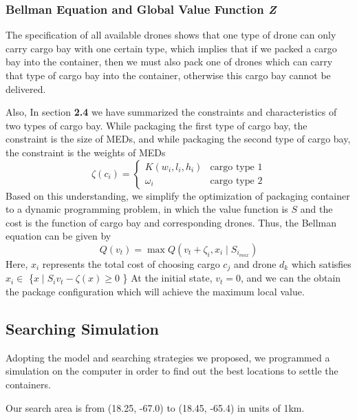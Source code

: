 \documentclass[12pt]{article}
\begin{document}
			\subsubsection{Bellman Equation and Global Value Function \textit{Z}}
			The specification of all available drones shows that one type of drone can only carry cargo bay with one certain type, which implies that if we packed a cargo bay into the container, then we must also pack one of drones which can carry that type of cargo bay into the container, otherwise this cargo bay cannot be delivered.\par 
			Also, In section \textbf{2.4} we have summarized the constraints and characteristics of two types of cargo bay. While packaging the first type of cargo bay, the constraint is the size of MEDs, and while packaging the second type of cargo bay, the constraint is the weights of MEDs
			\begin{equation}
				\zeta(c_i) = 
				\begin{cases}
				K(w_i, l_i, h_i) &\mbox{cargo type 1} \\
				\omega_i &\mbox{cargo type 2}
				\end{cases}
			\end{equation}
			Based on this understanding, we simplify the optimization of packaging container to a dynamic programming problem, in which the value function is $S$ and the cost is the function of cargo bay and corresponding drones. Thus, the Bellman equation can be given by 
			\begin{equation}
			Q(v_t) = \max Q(v_t+\zeta_i, x_i \mid S_{i_{max}}) 
			\end{equation}
			Here, $x_i$ represents the total cost of choosing cargo $c_j$ and drone $d_k$ which satisfies $ x_i \in$ \{$x \mid S_i  v_t-\zeta(x) \geq 0$ \}	
			At the initial state, $v_t = 0$, and we can the obtain the package configuration which will achieve the maximum local value. 
	
		
		\subsection{Searching Simulation}
		Adopting the model and searching strategies we proposed, we programmed a simulation on the computer in order to find out the best locations to settle the containers. \par 
		Our search area is from (18.25, -67.0) to (18.45, -65.4) in units of 1km. \par 
\end{document}
